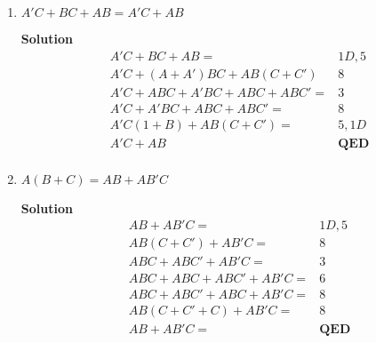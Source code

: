 \begin{enumerate}
\begin{enumerate}
                            \item $A'C+BC+AB = A'C+AB$
                                \begin{onlysolution}  \textbf{Solution}
                                    \begin{align*}
                                        &A'C + BC+AB =                          & 1D, 5 \\
                                        &A'C + (A+A')BC + AB(C+C')              & 8  \\
                                        &A'C + ABC + A'BC + ABC + ABC'=         & 3\\
                                        &A'C + A'BC + ABC + ABC'=               & 8\\
                                        &A'C(1+B) + AB(C+C')=                   & 5, 1D\\
                                        &A'C + AB                               & \textbf{{QED}} \\
                                    \end{align*}
                                \end{onlysolution}
                            \item $A(B+C)=AB+AB'C$

                                \begin{onlysolution}  \textbf{Solution}
                                    \begin{align*}
                                        &AB+AB'C=                           & 1D,5  \\
                                        &AB(C+C') + AB'C=                   & 8     \\
                                        &ABC+ABC'+AB'C=                     & 3     \\
                                        &ABC + ABC + ABC' + AB'C=           & 6     \\
                                        &ABC + ABC' + ABC + AB'C=           & 8     \\
                                        &AB(C+C'+C) + AB'C =                & 8     \\
                                        &AB + AB'C=                         & \textbf{{QED}}   \\
                                    \end{align*}
                                \end{onlysolution}


\end{enumerate}
\end{enumerate}

